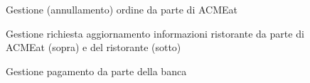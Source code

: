 \documentclass[11pt]{article} %
\begin{document}
\begin{figure}[!ht]
\begin{center}
\caption{Gestione (annullamento) ordine da parte di ACMEat }
\end{center}
\end{figure}

\begin{figure}[!ht]
\begin{center}
\caption{Gestione richiesta aggiornamento informazioni ristorante da parte di ACMEat (sopra) e del ristorante (sotto)}
\end{center}
\end{figure}

\begin{figure}[!ht]
\begin{center}
\caption{Gestione pagamento da parte della banca}
\end{center}
\end{figure}
\end{document}
